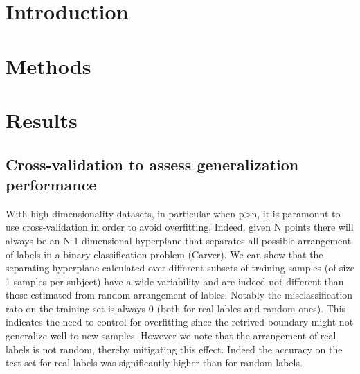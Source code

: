 \documentclass[12pt, a4paper, final, fleqn]{article}
\begin{document}
\newpage
\tableofcontents
\newpage
\section{Introduction}
\label{intro}



\section{Methods}
\label{methods}

\section{Results}
\label{results}

\subsection{Cross-validation to assess generalization performance}
With high dimensionality datasets, in particular when p>n, it is paramount to use cross-validation in order to avoid overfitting.
Indeed, given N points there will always be an N-1 dimensional hyperplane that separates all possible arrangement of labels in a
binary classification problem (Carver).
We can show that the separating hyperplane calculated over different subsets of training samples (of size 1 samples per subject) have a wide
variability and are indeed not different than those estimated from random arrangement of lables. Notably the misclassification rato  on the
training set is always 0 (both for real lables and random ones). This indicates the need to control for overfitting since the retrived 
boundary might not generalize well to new samples.
However we note that the arrangement of real labels is not random, thereby mitigating this effect. Indeed the accuracy on the test set for real
labels was significantly higher than for random labels.
\end{document}

